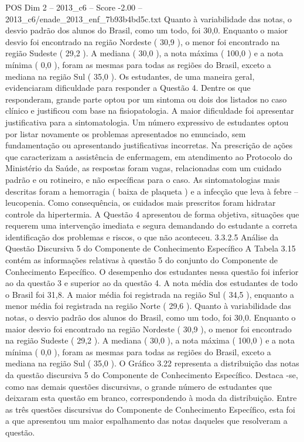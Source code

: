 \begin{textsample}{POS Dim 2 – 2013\_c6 – Score -2.00 – 2013\_c6/enade\_2013\_enf\_7b93b4bd5c.txt}
Quanto à variabilidade das notas, o desvio padrão dos alunos do Brasil, como um todo, foi 30,0.
Enquanto o maior desvio foi encontrado na região Nordeste ( 30,9 ), o menor foi encontrado na região Sudeste ( 29,2 ).
A mediana ( 30,0 ), a nota máxima ( 100,0 ) e a nota mínima ( 0,0 ), foram as mesmas para todas as regiões do Brasil, exceto a mediana na região Sul ( 35,0 ).
Os estudantes, de uma maneira geral, evidenciaram dificuldade para responder a Questão 4.
Dentre os que responderam, grande parte optou por um sintoma ou dois dos listados no caso clínico e justificou com base na fisiopatologia.
A maior dificuldade foi apresentar justificativa para a sintomatologia.
Um número expressivo de estudantes optou por listar novamente os problemas apresentados no enunciado, sem fundamentação ou apresentando justificativas incorretas.
Na prescrição de ações que caracterizam a assistência de enfermagem, em atendimento ao Protocolo do Ministério da Saúde, as respostas foram vagas, relacionadas com um cuidado padrão e ou rotineiro, e não específicas para o caso.
As sintomatologias mais descritas foram a hemorragia ( baixa de plaqueta ) e a infecção que leva à febre – leucopenia.
Como consequência, os cuidados mais prescritos foram hidratar controle da hipertermia.
A Questão 4 apresentou de forma objetiva, situações que requerem uma intervenção imediata e segura demandando do estudante a correta identificação dos problemas e riscos, o que não aconteceu. 3.3.2.5 Análise da Questão Discursiva 5 do Componente de Conhecimento Específico A Tabela 3.15 contém as informações relativas à questão 5 do conjunto do Componente de Conhecimento Específico.
O desempenho dos estudantes nessa questão foi inferior ao da questão 3 e superior ao da questão 4.
A nota média dos estudantes de todo o Brasil foi 31,8.
A maior média foi registrada na região Sul ( 34,5 ), enquanto a menor média foi registrada na região Norte ( 29,6 ).
Quanto à variabilidade das notas, o desvio padrão dos alunos do Brasil, como um todo, foi 30,0.
Enquanto o maior desvio foi encontrado na região Nordeste ( 30,9 ), o menor foi encontrado na região Sudeste ( 29,2 ).
A mediana ( 30,0 ), a nota máxima ( 100,0 ) e a nota mínima ( 0,0 ), foram as mesmas para todas as regiões do Brasil, exceto a mediana na região Sul ( 35,0 ).
O Gráfico 3.22 representa a distribuição das notas da questão discursiva 5 do Componente de Conhecimento Específico.
Destaca -se, como nas demais questões discursivas, o grande número de estudantes que deixaram esta questão em branco, correspondendo à moda da distribuição.
Entre as três questões discursivas do Componente de Conhecimento Específico, esta foi a que apresentou um maior espalhamento das notas daqueles que resolveram a questão.

\end{textsample}
